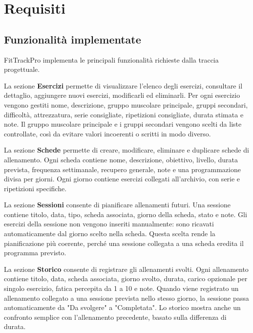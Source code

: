 \documentclass[11pt,a4paper]{article}
\begin{document}
\section{Requisiti}

\subsection{Funzionalità implementate}

FitTrackPro implementa le principali funzionalità richieste dalla traccia progettuale.

La sezione \textbf{Esercizi} permette di visualizzare l'elenco degli esercizi, consultare il dettaglio, aggiungere nuovi esercizi, modificarli ed eliminarli. Per ogni esercizio vengono gestiti nome, descrizione, gruppo muscolare principale, gruppi secondari, difficoltà, attrezzatura, serie consigliate, ripetizioni consigliate, durata stimata e note. Il gruppo muscolare principale e i gruppi secondari vengono scelti da liste controllate, così da evitare valori incoerenti o scritti in modo diverso.

La sezione \textbf{Schede} permette di creare, modificare, eliminare e duplicare schede di allenamento. Ogni scheda contiene nome, descrizione, obiettivo, livello, durata prevista, frequenza settimanale, recupero generale, note e una programmazione divisa per giorni. Ogni giorno contiene esercizi collegati all'archivio, con serie e ripetizioni specifiche.

La sezione \textbf{Sessioni} consente di pianificare allenamenti futuri. Una sessione contiene titolo, data, tipo, scheda associata, giorno della scheda, stato e note. Gli esercizi della sessione non vengono inseriti manualmente: sono ricavati automaticamente dal giorno scelto nella scheda. Questa scelta rende la pianificazione più coerente, perché una sessione collegata a una scheda eredita il programma previsto.

La sezione \textbf{Storico} consente di registrare gli allenamenti svolti. Ogni allenamento contiene titolo, data, scheda associata, giorno svolto, durata, carico opzionale per singolo esercizio, fatica percepita da 1 a 10 e note. Quando viene registrato un allenamento collegato a una sessione prevista nello stesso giorno, la sessione passa automaticamente da "Da svolgere" a "Completata". Lo storico mostra anche un confronto semplice con l'allenamento precedente, basato sulla differenza di durata.
\end{document}
